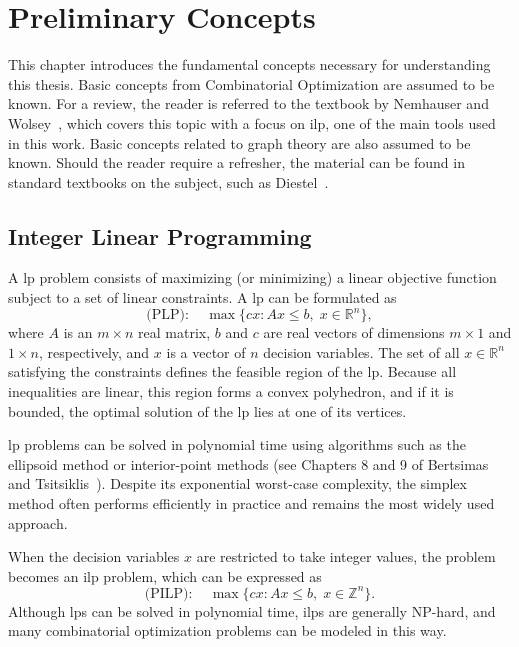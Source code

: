 \chapter{Preliminary Concepts}\label{chp:preliminary-concepts}

This chapter introduces the fundamental concepts necessary for understanding
this thesis. Basic concepts from Combinatorial Optimization are assumed to be
known. For a review, the reader is referred to the textbook by Nemhauser and
Wolsey~\cite{Nemhauser}, which covers this topic with a focus on \gls{ilp}, one
of the main tools used in this work. Basic concepts related to graph theory are
also assumed to be known. Should the reader require a refresher, the material
can be found in standard textbooks on the subject, such as
Diestel~\cite{diestel:2005}.

\section{Integer Linear Programming}\label{sec:integer-linear-programming}
A \gls{lp} problem consists of maximizing (or minimizing) a linear objective function subject to a set of linear constraints. A \gls{lp} can be formulated as
\begin{equation}
	\text{(PLP)}:\quad \max \{ c x : A x \leq b, \; x \in \mathbb{R}^n \},
\end{equation}
where $A$ is an $m \times n$ real matrix, $b$ and $c$ are real vectors of dimensions $m \times 1$ and $1 \times n$, respectively, and $x$ is a vector of $n$ decision variables.
The set of all $x \in \mathbb{R}^n$ satisfying the constraints defines the feasible region of the \gls{lp}. Because all inequalities are linear, this region forms a convex polyhedron, and if it is bounded, the optimal solution of the \gls{lp} lies at one of its vertices.

\gls{lp} problems can be solved in polynomial time using algorithms such as the ellipsoid method or interior-point methods (see Chapters 8 and 9 of Bertsimas and Tsitsiklis~\cite{bertsimas1997introduction}). Despite its exponential worst-case complexity, the simplex method often performs efficiently in practice and remains the most widely used approach.

When the decision variables $x$ are restricted to take integer values, the problem becomes an \gls{ilp} problem, which can be expressed as
\begin{equation}
	\text{(PILP)}:\quad \max \{ c x : A x \leq b, \; x \in \mathbb{Z}^n \}.
\end{equation}
Although \gls{lp}s can be solved in polynomial time, \gls{ilp}s are generally NP-hard, and many combinatorial optimization problems can be modeled in this way.

